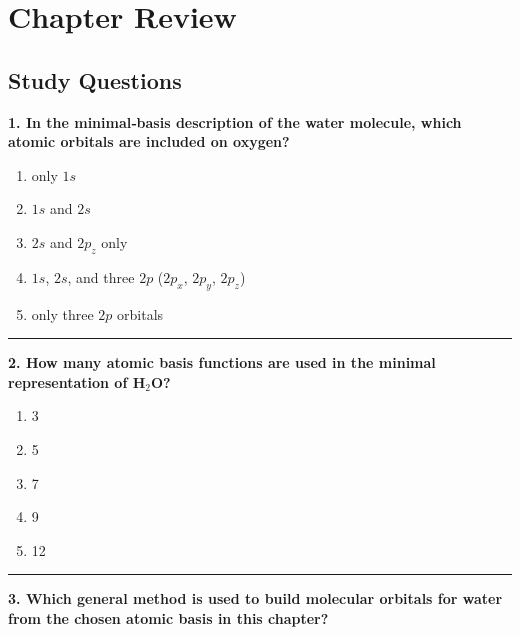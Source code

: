 \documentclass[
  english,
  9pt,
]{extbook}
\providecommand{\tightlist}{%
  \setlength{\itemsep}{0pt}\setlength{\parskip}{0pt}}
\theoremstyle{definition}
\theoremstyle{definition}
\theoremstyle{definition}
\theoremstyle{definition}
\theoremstyle{remark}
\begin{document}
\section{Chapter Review}\label{rev12}

\subsection{Study Questions}\label{quest12}

\textbf{1. In the minimal‑basis description of the water molecule, which atomic orbitals are included on oxygen?}

\begin{enumerate}
\def\labelenumi{\alph{enumi}.}
\tightlist
\item
  only \(1s\)\\
\item
  \(1s\) and \(2s\)\\
\item
  \(2s\) and \(2p_z\) only\\
\item
  \(1s\), \(2s\), and three \(2p\) (\(2p_x\), \(2p_y\), \(2p_z\))\\
\item
  only three \(2p\) orbitals
\end{enumerate}

\begin{center}\rule{0.5\linewidth}{0.5pt}\end{center}

\textbf{2. How many atomic basis functions are used in the minimal representation of H\(_2\)O?}

\begin{enumerate}
\def\labelenumi{\alph{enumi}.}
\tightlist
\item
  3\\
\item
  5\\
\item
  7\\
\item
  9\\
\item
  12
\end{enumerate}

\begin{center}\rule{0.5\linewidth}{0.5pt}\end{center}

\textbf{3. Which general method is used to build molecular orbitals for water from the chosen atomic basis in this chapter?}
\end{document}
